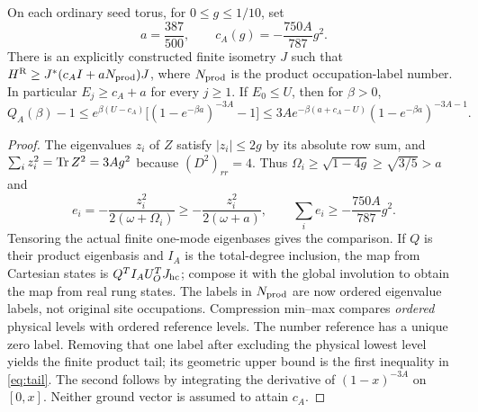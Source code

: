 \begin{proposition}\label{prop:reference}
On each ordinary seed torus, for $0\le g\le1/10$, set
\begin{equation}\label{eq:ac}
 a=\frac{387}{500},\qquad c_A(g)=-\frac{750A}{787}g^2.
\end{equation}
There is an explicitly constructed finite isometry $J$ such that
$H^{\rm R}\ge J^*(c_A I+aN_{\rm prod})J$, where $N_{\rm prod}$ is the
product occupation-label number. In particular $E_j\ge c_A+a$ for every $j\ge1$.
If $E_0\le U$, then for $\beta>0$,
\begin{equation}\label{eq:tail}
 Q_A(\beta)-1\le e^{\beta(U-c_A)}
 \big[(1-e^{-\beta a})^{-3A}-1\big]
 \le3A e^{-\beta(a+c_A-U)}(1-e^{-\beta a})^{-3A-1}.
\end{equation}
\end{proposition}
\begin{proof}
The eigenvalues $z_i$ of $Z$ satisfy $|z_i|\le2g$ by its absolute row sum,
and $\sum_i z_i^2=\operatorname{Tr} Z^2=3Ag^2$ because $(D^2)_{rr}=4$.
Thus $\Omega_i\ge\sqrt{1-4g}\ge\sqrt{3/5}>a$ and
\[
 e_i=-\frac{z_i^2}{2(\omega+\Omega_i)}
 \ge-\frac{z_i^2}{2(\omega+a)},\qquad
 \sum_i e_i\ge-\frac{750A}{787}g^2.
\]
Tensoring the actual finite one-mode eigenbases gives the comparison. If $Q$
is their product eigenbasis and $I_A$ is the total-degree inclusion, the map
from Cartesian states is $Q^T I_A U_O^T J_{\rm hc}$; compose it with the
global involution to obtain the map from real rung states. The labels in
$N_{\rm prod}$ are now ordered eigenvalue labels, not original site occupations. Compression
min--max compares \emph{ordered} physical levels with ordered reference levels.
The number reference has a unique zero label. Removing that one label after
excluding the physical lowest level yields the finite product tail; its
geometric upper bound is the first inequality in \eqref{eq:tail}. The second
follows by integrating the derivative of $(1-x)^{-3A}$ on $[0,x]$.
Neither ground vector is assumed to attain $c_A$.
\end{proof}
